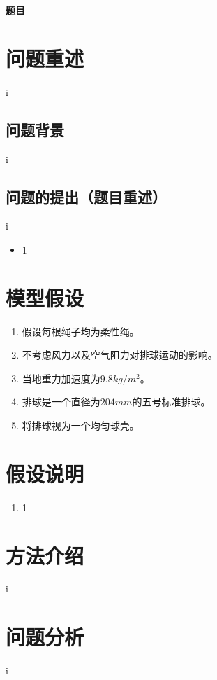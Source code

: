 \documentclass{cumcm}
\begin{document}
\begin{minipage}{0.9\textwidth}
\centering\LARGE\textbf{题目}

\end{minipage}
\begin{abstract}
\end{abstract}

\newpage
\section{问题重述}
i
\subsection{问题背景}
i
\subsection{问题的提出（题目重述）}
i

\begin{itemize}
  \item 1
\end{itemize}

\section{模型假设}
\begin{enumerate}
\item 假设每根绳子均为柔性绳。
\item 不考虑风力以及空气阻力对排球运动的影响。
\item 当地重力加速度为$9.8kg/m^2$。
\item 排球是一个直径为$204mm$的五号标准排球。
\item 将排球视为一个均匀球壳。
\end{enumerate}

\section{假设说明}
\begin{enumerate}
\item 1
\end{enumerate}

\section{方法介绍}
i
\section{问题分析}
i
\end{document}
